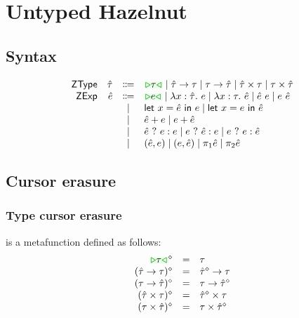 \documentclass[formalism.tex]{subfiles}
\begin{document}


\section{Untyped Hazelnut}

\subsection{Syntax}
\[\begin{array}{rrcl}
  \ZTMName & \ZTMV & \Coloneqq & \ZTCursor{\TMV} \mid \ZTArrowL{\ZTMV}{\TMV} \mid \ZTArrowR{\TMV}{\ZTMV} \mid \ZTProdL{\ZTMV}{\TMV} \mid \ZTProdR{\TMV}{\ZTMV} \\
  \ZMName  & \ZMV  & \Coloneqq & \ZCursor{\EMV} \mid \ZLamT{x}{\ZTMV}{\EMV} \mid \ZLamE{x}{\TMV}{\ZMV} \mid \ZApL{\ZMV}{\EMV} \mid \ZApR{\EMV}{\ZMV} \\
           &       & \mid         & \ZLetL{x}{\ZMV}{\EMV} \mid \ZLetR{x}{\EMV}{\ZMV} \\
           &       & \mid         & \ZPlusL{\ZMV}{\EMV} \mid \ZPlusR{\EMV}{\ZMV} \\
           &       & \mid         & \ZIfC{\ZMV}{\EMV}{\EMV} \mid \ZIfL{\EMV}{\ZMV}{\EMV} \mid \ZIfR{\EMV}{\EMV}{\ZMV} \\
           &       & \mid         & \ZPairL{\ZMV}{\EMV} \mid \ZPairR{\EMV}{\ZMV} \mid \ZProjL{\ZMV} \mid \ZProjR{\ZMV} \\
\end{array}\]

\subsection{Cursor erasure}
\subsubsection{Type cursor erasure}
\judgbox{\ensuremath{\cursorErase{\ZTMV}}} is a metafunction defined as follows:
%
\newcommand{\cursorErasesToRow}[2]{\ensuremath{\cursorErase{#1} & = & #2}}
\[\begin{array}{rcl}
  \cursorErasesToRow{\ZTCursor{\TMV}}{\TMV} \\
  \cursorErasesToRow{(\ZTArrowL{\ZTMV}{\TMV})}{\TArrow{\cursorErase{\ZTMV}}{\TMV}} \\
  \cursorErasesToRow{(\ZTArrowR{\TMV}{\ZTMV})}{\TArrow{\TMV}{\cursorErase{\ZTMV}}} \\
  \cursorErasesToRow{(\ZTProdL{\ZTMV}{\TMV})}{\TProd{\cursorErase{\ZTMV}}{\TMV}} \\
  \cursorErasesToRow{(\ZTProdR{\TMV}{\ZTMV})}{\TProd{\TMV}{\cursorErase{\ZTMV}}} \\
\end{array}\]
\end{document}
